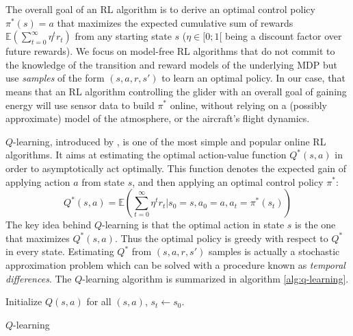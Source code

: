 \documentclass[a4paper, 10pt, conference]{ieeeconf}
\begin{document}
The overall goal of an RL algorithm is to derive an optimal control policy $\pi^*(s) = a$ that maximizes the expected cumulative sum of rewards $\mathbb{E}\left(\sum\limits_{t=0}^\infty \eta^t r_t\right)$ from any starting state $s$ ($\eta\in[0;1[$ being a discount factor over future rewards). We focus on model-free RL algorithms that do not commit to the knowledge of the transition and reward models of the underlying MDP but use \emph{samples} of the form $(s,a,r,s')$ to learn an optimal policy.
In our case, that means that an RL algorithm controlling the glider with an overall goal of gaining energy will use sensor data to build $\pi^*$ online, without relying on a (possibly approximate) model of the atmosphere, or the aircraft's flight dynamics. %

$Q$-learning, introduced by \cite{watkins92qlearning}, is one of the most simple and popular online RL algorithms. It aims at estimating the optimal action-value function $Q^*(s,a)$ in order to asymptotically act optimally. This function denotes the expected gain of applying action $a$ from state $s$, and then applying an optimal control policy $\pi^*$:
\begin{equation*}
Q^*(s,a) = \mathbb{E}\left(\sum\limits_{t=0}^\infty \eta^t r_t | s_0=s, a_0=a, a_t=\pi^*(s_t)\right)
\end{equation*}
The key idea behind $Q$-learning is that the optimal action in state $s$ is the one that maximizes $Q^*(s,a)$. Thus the optimal policy is greedy with respect to $Q^*$ in every state. Estimating $Q^*$ from $\left(s,a,r,s'\right)$ samples is actually a stochastic approximation problem which can be solved with a procedure known as \emph{temporal differences}. The $Q$-learning algorithm is summarized in algorithm \ref{alg:q-learning}.

\begin{algorithm2e}
\DontPrintSemicolon
Initialize $Q(s,a)$ for all $(s,a)$,\;{}
$s_{t} \leftarrow s_{0}$.\;
\caption{$Q$-learning}
\label{alg:q-learning}
\end{algorithm2e}
\end{document}
